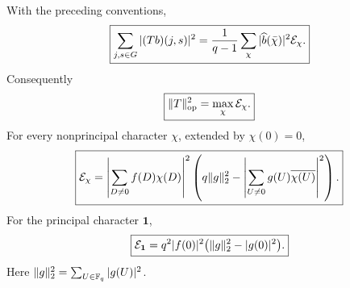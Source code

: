 \begin{theorem}
\label{thm:tpc35-product-spectrum}
With the preceding conventions,
\begin{equation}
 \boxed{
 \sum_{j,s\in G}|(Tb)(j,s)|^2
 =\frac1{q-1}\sum_\chi
 |\widehat b(\bar\chi)|^2\mathcal E_\chi.}
 \label{eq:tpc35-product-spectral-identity}
\end{equation}
Consequently
\begin{equation}
 \boxed{\|T\|_{\operatorname{op}}^2=\max_\chi\mathcal E_\chi.}
 \label{eq:tpc35-product-op-norm}
\end{equation}
For every nonprincipal character \(\chi\), extended by \(\chi(0)=0\),
\begin{equation}
 \boxed{
 \mathcal E_\chi
 =\left|\sum_{D\ne0}f(D)\chi(D)\right|^2
 \left(
 q\|g\|_2^2
 -\left|\sum_{U\ne0}g(U)\overline{\chi(U)}\right|^2
 \right).}
 \label{eq:tpc35-nonprincipal-energy}
\end{equation}
For the principal character \(\mathbf1\),
\begin{equation}
 \boxed{
 \mathcal E_{\mathbf1}
 =q^2|f(0)|^2\bigl(\|g\|_2^2-|g(0)|^2\bigr).}
 \label{eq:tpc35-principal-energy}
\end{equation}
Here \(\|g\|_2^2=\sum_{U\in\mathbb F_q}|g(U)|^2\).
\end{theorem}

